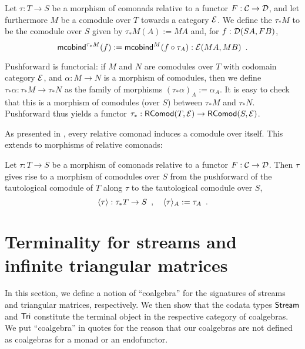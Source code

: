 \documentclass[envcountsame]{llncs}
\begin{document}
\begin{definition}%
\label{def:pushforward_comodule} 
  Let $\tau : T\to S$ be a morphism of comonads relative to a functor $F : \C \to \D$, and let furthermore $M$ be a 
  comodule over $T$ towards a category $\E$. We define the  $\tau_*M$ to be the comodule over $S$ given by
  $  \tau_*M(A) := MA $
  and, for $f : \D(SA,FB)$,
   \[ \mcobind^{\tau_*M}(f) := \mcobind^M(\comp{\tau_A}{f}) : \E(MA,MB) \enspace . \]
   
  \noindent
  Pushforward is functorial: if $M$ and $N$ are comodules over $T$ with codomain category $\E$, and $\alpha : M\to N$ is 
    a morphism of comodules, then we define 
     $\tau_*\alpha : \tau_*M \to \tau_*N$
    as the family of morphisms
     $ (\tau_*\alpha)_A := \alpha_A$.
  It is easy to check that this is a morphism of comodules (over $S$) between $\tau_*M$ and $\tau_*N$.
  Pushforward thus yields a functor $\tau_*:\RComod(T,\E) \to \RComod(S,\E)$.
\end{definition}


As presented in , every relative comonad induces a comodule over itself.
This extends to morphisms of relative comonads:

\begin{definition}%
\label{def:induced} %
  Let $\tau : T\to S$ be a morphism of comonads relative to a functor $F : \C \to \D$.
  Then $\tau$ gives rise to a morphism of comodules over $S$ from the pushforward of the tautological comodule
  of $T$ along $\tau$ to the tautological comodule over $S$,
  \[ \induced{\tau} : \tau_*T \to S \enspace , \quad \induced{\tau}_A := \tau_A \enspace . \]
\end{definition}




\section{Terminality for streams and infinite triangular matrices}\label{sec:coalgebras_for_tri}

In this section, we define a notion of \enquote{coalgebra} for the signatures of streams and triangular matrices,
respectively. We then show that the codata types $\stream$ and $\Tri$ constitute the terminal object in
the respective category of coalgebras.
We put \enquote{coalgebra} in quotes for the reason that our coalgebras are not defined as coalgebras for a monad or an endofunctor.
\end{document}

